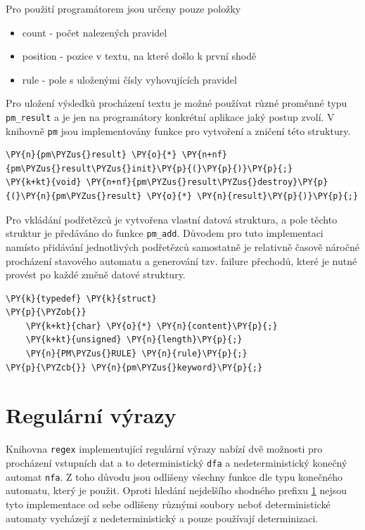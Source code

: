 Pro použití programátorem jsou určeny pouze položky

\begin{itemize}
	\item{count - počet nalezených pravidel}
	\item{position - pozice v textu, na které došlo k první shodě}
	\item{rule - pole s uloženými čísly vyhovujících pravidel}
\end{itemize}

Pro uložení výsledků procházení textu je možné používat různé proměnné typu \texttt{pm\_result}
a je jen na programátory konkrétní aplikace jaký postup zvolí.
V knihovně \texttt{pm} jsou implementovány funkce pro vytvoření a zničení této struktury.

\begin{Verbatim}[commandchars=\\\{\}]
\PY{n}{pm\PYZus{}result} \PY{o}{*} \PY{n+nf}{pm\PYZus{}result\PYZus{}init}\PY{p}{(}\PY{p}{)}\PY{p}{;}
\PY{k+kt}{void} \PY{n+nf}{pm\PYZus{}result\PYZus{}destroy}\PY{p}{(}\PY{n}{pm\PYZus{}result} \PY{o}{*} \PY{n}{result}\PY{p}{)}\PY{p}{;}
\end{Verbatim}


Pro vkládání podřetězců je vytvořena vlastní datová struktura, a pole těchto struktur je předáváno do funkce
\texttt{pm\_add}. Důvodem pro tuto implementaci namísto přidávání jednotlivých podřetězců samostatně
je relativně časově náročné procházení stavového automatu a generování tzv. failure přechodů,
které je nutné provést po každé změně datové struktury.

\begin{Verbatim}[commandchars=\\\{\}]
\PY{k}{typedef} \PY{k}{struct}
\PY{p}{\PYZob{}}
	\PY{k+kt}{char} \PY{o}{*} \PY{n}{content}\PY{p}{;}
	\PY{k+kt}{unsigned} \PY{n}{length}\PY{p}{;}
	\PY{n}{PM\PYZus{}RULE} \PY{n}{rule}\PY{p}{;}
\PY{p}{\PYZcb{}} \PY{n}{pm\PYZus{}keyword}\PY{p}{;}
\end{Verbatim}

\section{Regulární výrazy}
Knihovna \texttt{regex} implementující regulární výrazy nabízí dvě možnosti pro procházení
vstupních dat a to deterministický \texttt{dfa} a nedeterministický konečný automat \texttt{nfa}.
Z toho důvodu jsou odlišeny všechny funkce dle typu konečného automatu, který je použit.
Oproti hledání nejdelšího shodného prefixu \ref{} nejsou tyto implementace od sebe odlišeny
různými soubory neboť deterministické automaty vycházejí z nedeterministický a pouze používají
determinizaci.

